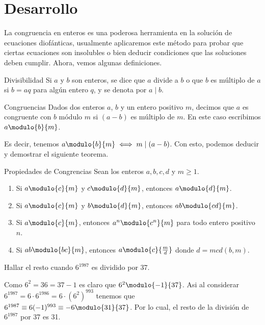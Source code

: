 \section{Desarrollo}

La congruencia en enteros es una poderosa herramienta en la solución de ecuaciones diofánticas, usualmente aplicaremos
este método para probar que ciertas ecuaciones son insolubles o bien deducir condiciones que las soluciones deben cumplir.
Ahora, vemos algunas definiciones.

\begin{definition.box}{Divisibilidad}{}
    Si $a$ y $b$ son enteros, se dice que $a$ divide a $b$ o que $b$ es múltiplo de $a$ si $b = aq$ para algún entero $q$,
    y se denota por $a \mid b$.
\end{definition.box}

\begin{definition.box}{Congruencias}{}
    Dados dos enteros $a$, $b$ y un entero positivo $m$, decimos que $a$ es congruente con $b$ módulo $m$ si $(a - b)$ es múltiplo de $m$.
    En este caso escribimos $a \modulo{b}{m}$.
\end{definition.box}
Es decir, tenemos $a \modulo{b}{m} \iff m \mid (a - b)$.
Con esto, podemos deducir y demostrar el siguiente teorema.

\begin{theorem.box}{Propiedades de Congrencias}{}
    Sean los enteros $a,b,c,d$ y $m \geq 1$.
    \begin{enumerate}
        \item Si $a \modulo{c}{m}$ y $c \modulo{d}{m}$, entonces $a \modulo{d}{m}$.
        \item Si $a \modulo{c}{m}$ y $b \modulo{d}{m}$, entonces $ab \modulo{cd}{m}$.
        \item Si $a \modulo{c}{m}$, entonces $a^n \modulo{c^n}{m}$ para todo entero positivo $n$.
        \item Si $ab \modulo{bc}{m}$, entonces $a \modulo{c}{\frac{m}{d}}$ donde $d = mcd(b,m)$.
    \end{enumerate}
\end{theorem.box}

\begin{example}
    Hallar el resto cuando $6^{1987}$ es dividido por 37.
\end{example}
\begin{solution}
    Como $6^2 = 36 = 37 - 1$ es claro que $6^2 \modulo{-1}{37}$.
    Asi al considerar $6^{1987} = 6\cdot 6^{1986} = 6\cdot (6^2)^{993}$ tenemos que $6^{1987} \equiv 6(-1)^{993} \equiv -6 \modulo{31}{37}$.
    Por lo cual, el resto de la división de $6^{1987}$ por 37 es 31.
\end{solution}

